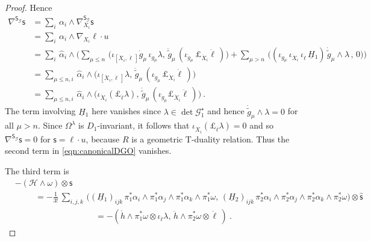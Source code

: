 \documentclass[a4paper, reqno, 11pt]{amsart}
\numberwithin{equation}{section}
\theoremstyle{definition}
\newcommand{\red}[1]{\underline{#1}}
\newcommand{\cH}{{\mathcal H}}
\newcommand{\ccG}{{\mathscr G}}
\newcommand{\sfS}{{\mathsf{S}}}
\newcommand{\sfs}{{\mathsf{s}}}
\theoremstyle{remark}
\begin{document}
\begin{proof}
    Hence
    \begin{equation}
    \begin{aligned}
        \nabla^{\sfS_\ccG} \sfs &= \sum_i\, \alpha_i \wedge\nabla^{\sfS_\ccG}_{X_i}\sfs \\[4pt]
        &= \sum_i\,\alpha_i \wedge \nabla_{X_i}\ell \cdot u \\[4pt]
        &= \sum_i\,\widehat \alpha_i \wedge\Big(\sum_{\mu \leqslant n}\,  \big(\iota_{[\dot X_i, \dot\ell\,]} \dot g_\mu\, \iota_{\dot g_\mu}\lambda,\, \ddot {\tilde g}_\mu \, (\iota_{\ddot g_\mu}\, \pounds_{\ddot X_i} \ddot\ell\,)\big) + \sum_{\mu >n}\, \big((\iota_{\dot g_\mu}\,\iota_{\dot X_i}\, \iota_{\dot\ell}\, \red H{}_1)\, \dot {\tilde g}_\mu\wedge \lambda\, ,\, 0\big)\Big) \\[4pt]
        &= \sum_{\mu \leqslant n,i}\, \widehat \alpha_i \wedge \big(\iota_{[\dot X_i, \dot\ell\,]} \lambda, \, \ddot {\tilde g}_\mu \, (\iota_{\ddot g_\mu}\,\pounds_{\ddot X_i} \ddot\ell\,)\big) \\[4pt]
        &= \sum_{\mu \leqslant n,i}\, \widehat \alpha_i \wedge \big(\iota_{\dot X_i}(\pounds_{\dot\ell} \lambda), \, \ddot {\tilde g}_\mu \, (\iota_{\ddot g_\mu}\pounds_{\ddot X_i} \ddot\ell\,)\big) \ .
    \end{aligned}
    \end{equation}
The term involving $\red H{}_1$ here vanishes since $\lambda \in \det \ccG_1^\star$ and hence $\dot {\tilde g}_\mu \wedge \lambda = 0$ for all $\mu>n$. Since $\Omega^\lambda$ is $D_1$-invariant, it follows that $\iota_{\dot X_i} (\pounds_{\dot\ell} \lambda) = 0$ and so $\nabla^{\sfS_\ccG} \sfs = 0$ for $\sfs = \ell\cdot u$, because $R$ is a geometric T-duality relation. Thus the second term in \eqref{eqn:canonicalDGO} vanishes.

The third term is
\begin{equation}
\begin{aligned}
    & -(\cH \wedge \omega) \otimes \sfs \\[4pt]
    & \hspace{1cm} = -\frac 1{3!}\,\sum_{i,j,k}\,\big((\red H{}_1)_{ijk}\, \pi_1^*\alpha_i \wedge \pi_1^*\alpha_j \wedge \pi_1^*\alpha_k \wedge \pi_1^*\omega,\, (\red H{}_2)_{ijk}\, \pi_2^*\alpha_i \wedge \pi_2^*\alpha_j \wedge \pi_2^*\alpha_k \wedge \pi_2^*\omega \big) \otimes \widehat\sfs\\[4pt]
    & \hspace{4cm}=-(\dot h \wedge \pi_1^*\omega\otimes\iota_{\dot\ell}\lambda, \, \ddot h \wedge \pi_2^*\omega\otimes\ddot\ell\,) \ .
\end{aligned}
\end{equation}


\end{proof}
\end{document}
